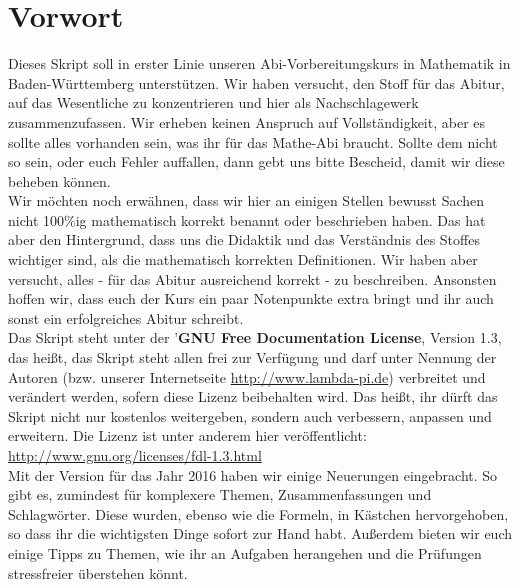 \chapter*{Vorwort}
	Dieses Skript soll in erster Linie unseren Abi-Vorbereitungskurs in
	Mathematik in Baden-Württemberg unterstützen. Wir haben versucht, den Stoff für
	das Abitur, auf das Wesentliche zu konzentrieren und hier als Nachschlagewerk
	zusammenzufassen.
	Wir erheben keinen Anspruch auf Vollständigkeit, aber es sollte alles vorhanden
	sein, was ihr für das Mathe-Abi braucht. Sollte dem nicht so sein, oder euch
	Fehler auffallen, dann gebt uns bitte Bescheid, damit wir diese beheben können.\\ 
	Wir möchten noch erwähnen, dass wir hier an einigen Stellen bewusst Sachen
	nicht 100\%ig mathematisch korrekt benannt oder beschrieben haben. Das hat
	aber den Hintergrund, dass uns die Didaktik und das Verständnis des Stoffes wichtiger sind, als die
	mathematisch korrekten Definitionen. Wir haben aber versucht, alles - für das
	Abitur ausreichend korrekt - zu beschreiben. Ansonsten hoffen wir, dass euch
	der Kurs ein paar Notenpunkte extra bringt und ihr auch sonst ein erfolgreiches
	Abitur schreibt.\\
	Das Skript steht unter der '\textbf{GNU Free Documentation License}, Version
	1.3, das heißt, das Skript steht allen frei zur Verfügung und darf unter
	Nennung der Autoren (bzw. unserer Internetseite \url{http://www.lambda-pi.de})
	verbreitet und verändert werden, sofern diese Lizenz beibehalten wird. Das
	heißt, ihr dürft das Skript nicht nur kostenlos weitergeben, sondern auch
	verbessern, anpassen und erweitern. Die Lizenz ist unter
	anderem hier veröffentlicht:\\
	\url{http://www.gnu.org/licenses/fdl-1.3.html}\\
	Mit der Version für das Jahr 2016 haben wir einige Neuerungen eingebracht. So
	gibt es, zumindest für komplexere Themen, Zusammenfassungen und Schlagwörter.
	Diese wurden, ebenso wie die Formeln, in Kästchen hervorgehoben, so dass ihr
	die wichtigsten Dinge sofort zur Hand habt. Außerdem bieten wir euch einige
	Tipps zu Themen, wie ihr an Aufgaben herangehen und die Prüfungen
	stressfreier überstehen könnt.
